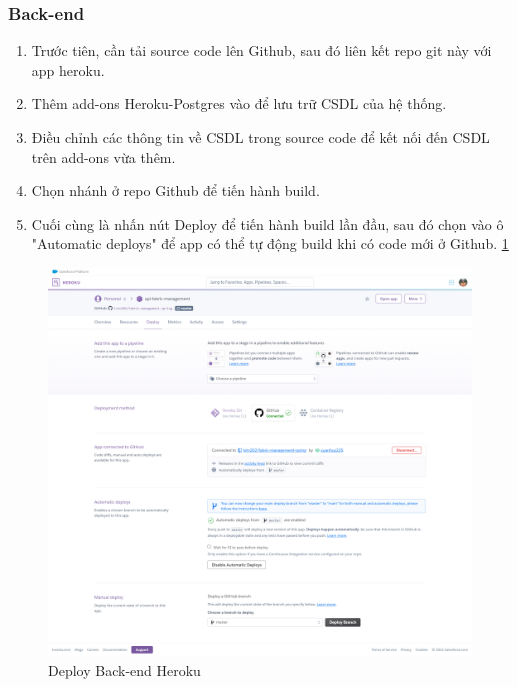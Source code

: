 \subsubsection{Back-end}
\begin{enumerate}
    \item Trước tiên, cần tải source code lên Github, sau đó liên kết repo git này với app heroku.
    \item Thêm add-ons Heroku-Postgres vào để lưu trữ CSDL của hệ thống.
    \item Điều chỉnh các thông tin về CSDL trong source code để kết nối đến CSDL trên add-ons vừa thêm.
    \item Chọn nhánh ở repo Github để tiến hành build.
    \item Cuối cùng là nhấn nút Deploy để tiến hành build lần đầu, sau đó chọn vào ô "Automatic deploys" để app có thể tự động build khi có code mới ở Github. \ref{deploy_back_end}
\end{enumerate}

\begin{figure}[H]
    \begin{center}
        \includegraphics[width=16cm]{Image/Technical/deploy-back-end.png}
        \caption{Deploy Back-end Heroku}
        \label{deploy_back_end}
    \end{center}
\end{figure}